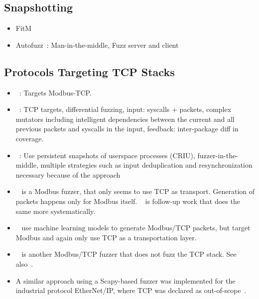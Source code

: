 \documentclass{article}
\let\savedCite=\cite
\renewcommand{\cite}{\unskip~\savedCite}
\begin{document}
\begin{multicols}{2}
\begin{itemize}
  \end{itemize}

  \subsection{Snapshotting}
  \begin{itemize}
    \item FitM
    \item Autofuzz\cite{Autofuzz}: Man-in-the-middle, Fuzz server and client

  \end{itemize}

  \subsection{Protocols Targeting TCP Stacks}
  \begin{itemize}
    \item {}\cite{GANFuzz}: Targets Modbus-TCP.
    \item {}\cite{TCPFuzz}: TCP targets, differential fuzzing, input: syscalls + packets, complex mutators including intelligent dependencies between the current and all previous packets and syscalls in the input, feedback: inter-package diff in coverage. 
    \item {}\cite{FitM}: Use persistent snapshots of userspace processes (CRIU), fuzzer-in-the-middle, multiple strategies such as input deduplication and resynchronization necessary because of the approach
    \item   {}\cite{ModbusTCP} is a Modbus fuzzer, that only seems to use TCP as transport. Generation of packets happens only for Modbus itself. \cite{MTFStorm} is follow-up work that does the same more systematically.
    \item {}\cite{MTA} use machine learning models to generate Modbus/TCP packets, but target Modbus and again only use TCP as a transportation layer.
    \item {}\cite{AnotherModbusTCP} is another Modbus/TCP fuzzer that does not fuzz the TCP stack. See also\cite{ModbusTCP2}.
    \item A similar approach using a Scapy-based fuzzer was implemented for the industrial protocol EtherNet/IP, where TCP was declared as out-of-scope\cite{ENIP}.
  \end{itemize}


\end{multicols}
\end{document}
